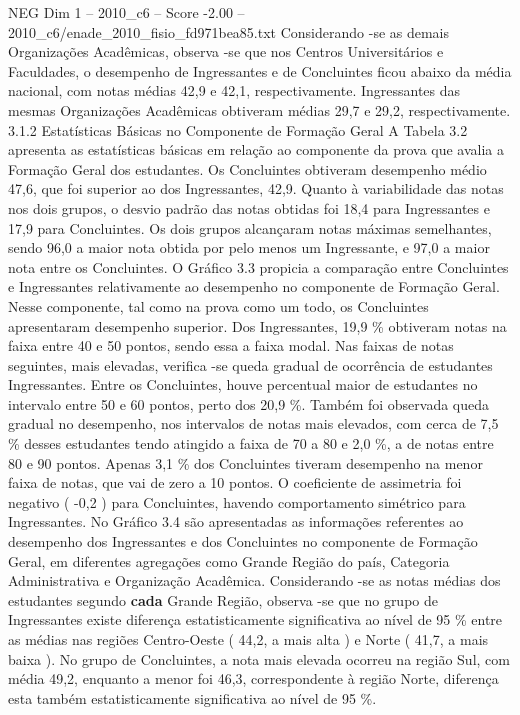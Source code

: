 \begin{textsample}{NEG Dim 1 – 2010\_c6 – Score -2.00 – 2010\_c6/enade\_2010\_fisio\_fd971bea85.txt}
Considerando -se as demais Organizações Acadêmicas, observa -se que nos Centros Universitários e Faculdades, o desempenho de Ingressantes e de Concluintes ficou abaixo da média nacional, com notas médias 42,9 e 42,1, respectivamente.
Ingressantes das mesmas Organizações Acadêmicas obtiveram médias 29,7 e 29,2, respectivamente. 3.1.2 Estatísticas Básicas no Componente de Formação Geral A Tabela 3.2 apresenta as estatísticas básicas em relação ao componente da prova que avalia a Formação Geral dos estudantes.
Os Concluintes obtiveram desempenho médio 47,6, que foi superior ao dos Ingressantes, 42,9.
Quanto à variabilidade das notas nos dois grupos, o desvio padrão das notas obtidas foi 18,4 para Ingressantes e 17,9 para Concluintes.
Os dois grupos alcançaram notas máximas semelhantes, sendo 96,0 a maior nota obtida por pelo menos um Ingressante, e 97,0 a maior nota entre os Concluintes.
O Gráfico 3.3 propicia a comparação entre Concluintes e Ingressantes relativamente ao desempenho no componente de Formação Geral.
Nesse componente, tal como na prova como um todo, os Concluintes apresentaram desempenho superior.
Dos Ingressantes, 19,9 \% obtiveram notas na faixa entre 40 e 50 pontos, sendo essa a faixa modal.
Nas faixas de notas seguintes, mais elevadas, verifica -se queda gradual de ocorrência de estudantes Ingressantes.
Entre os Concluintes, houve percentual maior de estudantes no intervalo entre 50 e 60 pontos, perto dos 20,9 \%.
Também foi observada queda gradual no desempenho, nos intervalos de notas mais elevados, com cerca de 7,5 \% desses estudantes tendo atingido a faixa de 70 a 80 e 2,0 \%, a de notas entre 80 e 90 pontos.
Apenas 3,1 \% dos Concluintes tiveram desempenho na menor faixa de notas, que vai de zero a 10 pontos.
O coeficiente de assimetria foi negativo ( -0,2 ) para Concluintes, havendo comportamento simétrico para Ingressantes.
No Gráfico 3.4 são apresentadas as informações referentes ao desempenho dos Ingressantes e dos Concluintes no componente de Formação Geral, em diferentes agregações como Grande Região do país, Categoria Administrativa e Organização Acadêmica.
Considerando -se as notas médias dos estudantes segundo \textbf{cada} Grande Região, observa -se que no grupo de Ingressantes existe diferença estatisticamente significativa ao nível de 95 \% entre as médias nas regiões Centro-Oeste ( 44,2, a mais alta ) e Norte ( 41,7, a mais baixa ).
No grupo de Concluintes, a nota mais elevada ocorreu na região Sul, com média 49,2, enquanto a menor foi 46,3, correspondente à região Norte, diferença esta também estatisticamente significativa ao nível de 95 \%.

\end{textsample}
